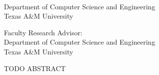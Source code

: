 \begin{singlespace}

\begin{center}


\tamumanuscripttitle
\vspace{3em}


\tamufullname\\
Department of Computer Science and Engineering\\
Texas A\&M University
\vspace{3em}


Faculty Research Advisor: \tamuadvisor
\\
Department of Computer Science and Engineering
\\
Texas A\&M University

\vspace{3em}

\end{center}
\end{singlespace}


\pagestyle{plain}
\setcounter{page}{1}



TODO ABSTRACT
 

\pagebreak{}

